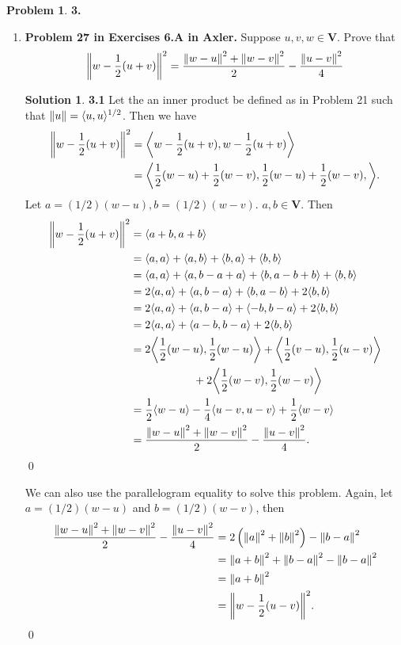 \documentclass{article}
\theoremstyle{definition}
\newtheorem*{prob*}{Problem}
\newtheorem*{sln*}{Solution}
\newcommand{\V}{\mathbf{V}}
\newcommand{\la}{\langle}
\newcommand{\ra}{\rangle}
\begin{document}
\begin{prob*}\textbf{3.}
	\begin{enumerate}
		\item \textbf{Problem 27 in Exercises 6.A in Axler.} Suppose $u,v,w \in \V$. Prove that
		\begin{align*}
		\norm{w - \frac{1}{2}(u+v)}^2 = \frac{\norm{w-u}^2 + \norm{w-v}^2}{2} - \frac{\norm{u-v}^2}{4}
		\end{align*}
		
		
		
		\begin{sln*}\textbf{3.1} Let the an inner product be defined as in Problem 21 such that $\norm{u} = \la u,u \ra^{1/2}$. Then we have
			\begin{align*}
			\norm{w - \frac{1}{2}(u+v)}^2 
			&= \bigg\la w - \frac{1}{2}(u+v) , w - \frac{1}{2}(u+v) \bigg\ra\\
			&= \bigg\la \frac{1}{2}(w-u) + \frac{1}{2}(w-v), \frac{1}{2}(w-u) + \frac{1}{2}(w-v), \bigg\ra.
			\end{align*}
			Let $a = (1/2)(w-u), b = (1/2)(w-v)$. $a,b\in \V$. Then
			\begin{align*}
			\norm{w - \frac{1}{2}(u+v)}^2
			&= \la a+b, a+b \ra\\
			&= \la a,a \ra + \la a,b \ra + \la b,a \ra + \la b,b \ra\\
			&= \la a,a \ra + \la a,b-a +a \ra + \la b,a - b +b  \ra + \la b,b \ra\\
			&= 2\la a,a \ra + \la a,b-a \ra + \la b,a - b  \ra + 2\la b,b \ra\\
			&= 2\la a,a \ra + \la a,b-a \ra + \la -b,b-a  \ra + 2\la b,b \ra\\
			&= 2\la a,a \ra + \la a-b,b-a \ra + 2\la b,b \ra\\
			&= 2\bigg\la \frac{1}{2}(w-u),\frac{1}{2}(w-u) \bigg\ra + \bigg\la \frac{1}{2}(v-u),\frac{1}{2}(u-v) \bigg\ra \\
			&\hspace{2cm}+ 2\bigg\la \frac{1}{2}(w-v),\frac{1}{2}(w-v) \bigg\ra\\
			&= \frac{1}{2}\la w-u \ra - \frac{1}{4}\la u-v, u-v  \ra + \frac{1}{2}\la w-v \ra\\
			&= \frac{\norm{w-u}^2 + \norm{w-v}^2}{2} - \frac{\norm{u-v}^2}{4}.
			\end{align*} \qed
			
			We can also use the parallelogram equality to solve this problem. Again, let $a = (1/2)(w-u)$ and $b = (1/2)(w-v)$, then
			\begin{align*}
			\frac{\norm{w-u}^2 + \norm{w-v}^2}{2} - \frac{\norm{u-v}^2}{4} 
			&= 2\left(\norm{a}^2 + \norm{b}^2 \right) - \norm{b-a}^2\\
			&= \norm{a+b}^2 + \norm{b-a}^2 - \norm{b-a}^2\\
			&= \norm{a+b}^2\\
			&= \norm{w - \frac{1}{2}(u-v)}^2. 
			\end{align*}\qed
			

\end{sln*}
\end{enumerate}
\end{prob*}
\end{document}
